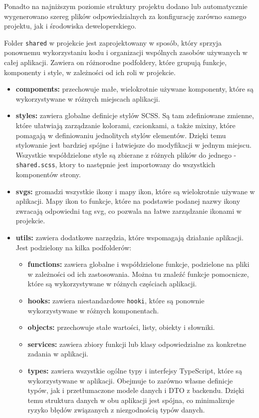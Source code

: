 \documentclass[twoside]{projektInzynierskiMS1}
\begin{document}
\vspace{0.5cm}

\noindent
Ponadto na najniższym poziomie struktury projektu dodano lub automatycznie wygenerowano szereg plików odpowiedzialnych za konfigurację zarówno samego projektu, jak i środowiska deweloperskiego.

\newpage

\noindent
Folder \texttt{shared} w projekcie jest zaprojektowany w sposób, który sprzyja ponownemu wykorzystaniu kodu i organizacji wspólnych zasobów używanych w całej aplikacji. Zawiera on różnorodne podfoldery, które grupują funkcje, komponenty i style, w zależności od ich roli w projekcie.

\begin{itemize}
    \item \textbf{components:} przechowuje małe, wielokrotnie używane komponenty, które są wykorzystywane w różnych miejscach aplikacji.
    \item \textbf{styles:} zawiera globalne definicje stylów SCSS. Są tam zdefiniowane zmienne, które ułatwiają zarządzanie kolorami, czcionkami, a także mixiny, które pomagają w definiowaniu jednolitych stylów elementów. Dzięki temu stylowanie jest bardziej spójne i łatwiejsze do modyfikacji w jednym miejscu. Wszystkie współdzielone style są zbierane z różnych plików do jednego - \texttt{shared.scss}, ktory to następnie jest importowany do wszystkich komponentów strony.
    \item \textbf{svgs:} gromadzi wszystkie ikony i mapy ikon, które są wielokrotnie używane w aplikacji. Mapy ikon to funkcje, które na podstawie podanej nazwy ikony zwracają odpowiedni tag svg, co pozwala na łatwe zarządzanie ikonami w projekcie.
    \item \textbf{utils:} zawiera dodatkowe narzędzia, które wspomagają działanie aplikacji. Jest podzielony na kilka podfolderów:
    \begin{itemize}
        \item \textbf{functions:} zawiera globalne i współdzielone funkcje, podzielone na pliki w zależności od ich zastosowania. Można tu znaleźć funkcje pomocnicze, które są wykorzystywane w różnych częściach aplikacji.
        \item \textbf{hooks:} zawiera niestandardowe \texttt{hooki}, które są ponownie wykorzystywane w różnych komponentach.
        \item \textbf{objects:} przechowuje stałe wartości, listy, obiekty i słowniki.
        \item \textbf{services:} zawiera zbiory funkcji lub klasy odpowiedzialne za konkretne zadania w aplikacji.
        \item \textbf{types:} zawiera wszystkie ogólne typy i interfejsy TypeScript, które są wykorzystywane w aplikacji. Obejmuje to zarówno własne definicje typów, jak i przetłumaczone modele danych i DTO z backendu. Dzięki temu struktura danych w obu aplikacji jest spójna, co minimalizuje ryzyko błędów związanych z niezgodnością typów danych.
    \end{itemize}
\end{itemize}
\end{document}
